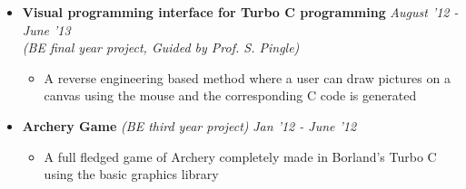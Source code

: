 \begin{itemize}

	\item \textbf{Visual programming interface for Turbo C programming} \hfill \emph{August '12 - June '13} \\
	\emph{(BE final year project, Guided by Prof. S. Pingle)} \\[-0.6cm]
	\begin{itemize}
	      \item A reverse engineering based method where a user can draw pictures on a canvas using the mouse and the corresponding C code is generated \\[-0.5cm]
	\end{itemize}

	\item \textbf{Archery Game} \emph{(BE third year project)} \hfill \emph{Jan '12 - June '12} \\[-0.6cm]
	\begin{itemize}
	      \item A full fledged game of Archery completely made in Borland's Turbo C using the basic graphics library \\[-0.4cm]
	\end{itemize}

\end{itemize}
